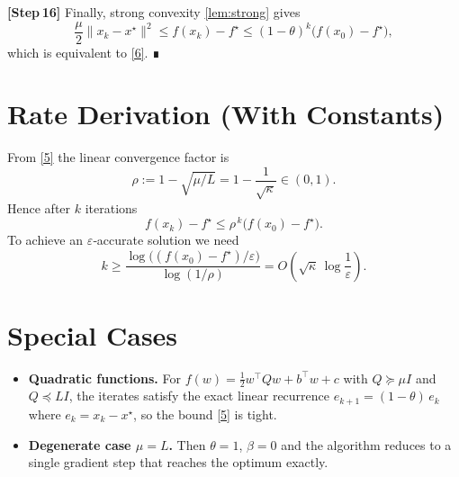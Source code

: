 \documentclass{article}
\begin{document}
\noindent\textbf{[Step 16]}  Finally, strong convexity \eqref{lem:strong} gives
\[
\frac{\mu}{2}\|x_{k}-x^{\star}\|^{2}
\le f(x_{k})-f^{\star}
\le (1-\theta)^{k}\bigl(f(x_{0})-f^{\star}\bigr),
\]
which is equivalent to \eqref{6}.  ∎

\section*{Rate Derivation (With Constants)}
From \eqref{5} the linear convergence factor is
\[
\rho:=1-\sqrt{\mu/L}=1-\frac{1}{\sqrt{\kappa}}\in(0,1).
\]
Hence after $k$ iterations
\[
f(x_{k})-f^{\star}\le \rho^{\,k}\bigl(f(x_{0})-f^{\star}\bigr).
\]
To achieve an $\varepsilon$‑accurate solution we need
\[
k\ge \frac{\log\bigl((f(x_{0})-f^{\star})/\varepsilon\bigr)}
           {\log(1/\rho)}
   = O\!\left(\sqrt{\kappa}\,\log\frac{1}{\varepsilon}\right).
\]

\section*{Special Cases}
\begin{itemize}
    \item \textbf{Quadratic functions.}  For $f(w)=\tfrac12 w^{\top}Qw+b^{\top}w+c$
    with $Q\succeq\mu I$ and $Q\preceq L I$, the iterates satisfy the exact
    linear recurrence $e_{k+1}= (1-\theta)\,e_{k}$ where $e_{k}=x_{k}-x^{\star}$,
    so the bound \eqref{5} is tight.
    \item \textbf{Degenerate case $\mu=L$.}  Then $\theta=1$, $\beta=0$ and the
    algorithm reduces to a single gradient step that reaches the optimum
    exactly.
\end{itemize}

\end{document}
